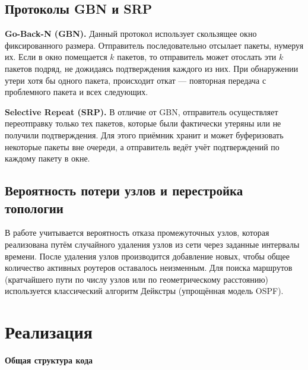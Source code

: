 \documentclass[a4paper,14pt]{extarticle}
\begin{document}
\subsection{Протоколы GBN и SRP}
\textbf{Go-Back-N (GBN).} Данный протокол использует скользящее окно фиксированного размера. Отправитель последовательно отсылает пакеты, нумеруя их. Если в окно помещается $k$ пакетов, то отправитель может отослать эти $k$ пакетов подряд, не дожидаясь подтверждения каждого из них. При обнаружении утери хотя бы одного пакета, происходит откат — повторная передача с проблемного пакета и всех следующих.

\textbf{Selective Repeat (SRP).} В отличие от GBN, отправитель осуществляет переотправку только тех пакетов, которые были фактически утеряны или не получили подтверждения. Для этого приёмник хранит и может буферизовать некоторые пакеты вне очереди, а отправитель ведёт учёт подтверждений по каждому пакету в окне.

\subsection{Вероятность потери узлов и перестройка топологии}
В работе учитывается вероятность отказа промежуточных узлов, которая реализована путём случайного удаления узлов из сети через заданные интервалы времени. После удаления узлов производится добавление новых, чтобы общее количество активных роутеров оставалось неизменным. Для поиска маршрутов (кратчайшего пути по числу узлов или по геометрическому расстоянию) используется классический алгоритм Дейкстры (упрощённая модель OSPF).

\section{Реализация}

\textbf{Общая структура кода}
\end{document}
